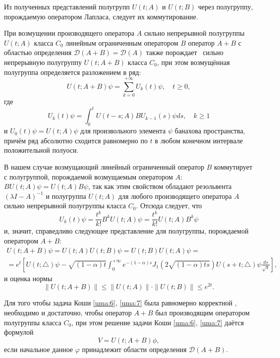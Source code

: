 Из полученных представлений полугрупп $U(t;A)$  и $U(t;B)$  через полугруппу, порождаемую оператором Лапласа, следует их коммутирование.

При возмущении производящего оператора  $A$ сильно непрерывной полугруппы  $U(t;A)$ класса $C_0$  линейным ограниченным оператором  $B$ оператор $A+B$ с областью определения  $\mathcal{D}(A+B)=\mathcal{D}(A)$ также порождает~\cite[с. 403]{umarov:bib:Hille} сильно непрерывную полугруппу $U(t; A+B)$  класса  $C_0$, при этом возмущённая полугруппа определяется разложением в ряд: 
$$U(t; A+B)\psi=\sum\limits_{k=0}^{+\infty}U_k(t)\psi,\quad   t\geq 0,$$ где  
$$U_k(t)\psi=\int_0^tU(t-s;A)BU_{k-1}(s)\psi{d}s,\quad   k\geq 1$$ и  $U_0(t)\psi=U(t;A)\psi$ для произвольного элемента $\psi$  банахова пространства, причём ряд абсолютно сходится равномерно по  $t$ в любом конечном интервале положительной полуоси.

В нашем случае возмущающий линейный ограниченный оператор  $B$ коммутирует с полугруппой, порождаемой возмущаемым оператором  $A$:  $BU(t;A)\psi=U(t;A)B\psi$, так как этим свойством обладают резольвента $(\lambda{I}-A)^{-1}$  и полугруппа  $U(t;A)$ для любого производящего оператора $A$  сильно непрерывной полугруппы класса  $C_0$. Отсюда следует, что 
$$U_k(t)\psi=\frac{t^k}{k!}B^kU(t;A)\psi=\frac{t^k}{k!}U(t;A)B^k\psi$$  и, значит, справедливо следующее представление для полугруппы, порождаемой оператором  $A+B$:
\begin{multline}
U(t;A+B)\psi=U(t;A)U(t;B)\psi=U(t;B)U(t;A)\psi=
\\
=e^t\left[U(t;\triangle)\psi-\sqrt{(1-\alpha)t}\int_0^{+\infty}e^{-(1-\alpha)s}J_1\left(2\sqrt{(1-\alpha)ts}\right)U(s+t;\triangle)\psi\frac{ds}{\sqrt{s}}\right],
\label{uma:8}
\end{multline}
и оценка нормы
\begin{equation}
\|U(t;A+B)\|\leq \|U(t;A)\|\cdot \|U(t;B)\|\leq e^{2t}.
\label{uma:9}
\end{equation}

Для того чтобы задача Коши \eqref{uma:6}, \eqref{uma:7} была равномерно корректной \cite[с.~64]{umarov:bib:Krein}, необходимо и достаточно, чтобы оператор   $A+B$ был производящим оператором полугруппы класса  $C_0$, при этом решение задачи Коши \eqref{uma:6}, \eqref{uma:7} даётся формулой
\begin{equation}
V =U(t;A+B)\phi,
\label{uma:10}
\end{equation}
если начальное данное $\varphi$  принадлежит области определения $\mathcal{D}(A+B)$.

